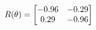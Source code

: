\documentclass[preview]{standalone}
\begin{document}
\begin{align*}
\special{dvisvgm:raw <g id='unique000'>}R(\theta) = \begin{bmatrix}-0.96 & -0.29\\0.29 & -0.96\end{bmatrix}\special{dvisvgm:raw </g>}
\end{align*}
\end{document}
